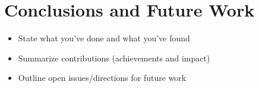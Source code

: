 
\chapter{Conclusions and Future Work}

\mynote
{
\begin{itemize}
\item State what you've done and what you've found
\item Summarize contributions (achievements and impact)
\item Outline open issues/directions for future work
\end{itemize}
}